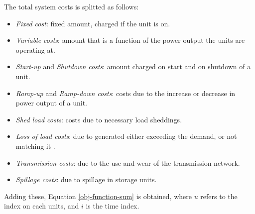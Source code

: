 The total system costs is splitted as follows:
\begin{itemize}
    \item \textit{Fixed cost}: fixed amount, charged if the unit is on.
    \item \textit{Variable costs}: amount that is a function of the power output the units are operating at.
    \item \textit{Start-up} and \textit{Shutdown costs}: amount charged on start and on shutdown of a unit.
    \item \textit{Ramp-up} and \textit{Ramp-down costs}: costs due to the increase or decrease in power output of a unit.
    \item \textit{Shed load costs}: costs due to necessary load sheddings.
    \item \textit{Loss of load costs}: due to generated either exceeding the demand, or not matching it .
    \item \textit{Transmission costs}: due to the use and wear of the transmission network.
    \item \textit{Spillage costs}: due to spillage in storage units.
\end{itemize}

Adding these, Equation \ref{obj-function-sum} is obtained, where $u$ refers to the index on each units, and $i$ is the time index.

